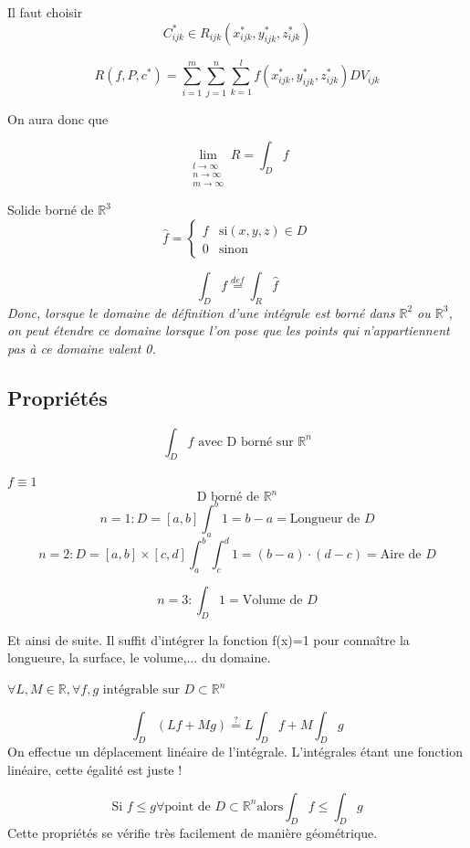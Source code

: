  Il faut choisir \[C_{ijk}^* \in R_{ijk} ( x_{ijk}^*,y_{ijk}^*,z_{ijk}^*)\]

\[R(f,P,c^*)=\sum_{i=1}^m \sum_{j=1}^n\sum_{k=1}^l f (x_{ijk}^*,y_{ijk}^*,z_{ijk}^*) D V_{ijk}\]

On aura donc que

$$\lim\limits_{\substack{l \to \infty \\ n \to \infty\\ m \to \infty}} R=\int_D f$$

Solide borné de $\mathbb{R}^3$
\[\hat{f}=
\left\{
\begin{array}{rr}
f & \text{si}(x,y,z)\in D \\
0 & \text{sinon}

\end{array}
\right.
\]

\[\int_D f \overset{def}{=} \int_R \hat{f}\]
\emph{
Donc, lorsque le domaine de définition d'une intégrale est borné dans $\mathbb{R}^2$ ou $\mathbb{R}^3$, on peut étendre ce domaine lorsque l'on pose que les points qui n'appartiennent pas à ce domaine valent 0.}
\subsection{Propriétés}

\[\int_D f \text{ avec D borné sur } \mathbb{R}^n\]

\begin{myprop}
$f\equiv 1 $
\[\text{D borné de }\mathbb{R}^n\]
\[n=1 : D=[a,b] \int_a^b 1 = b-a = \text{Longueur de }D\]
\[n=2 : D=[a,b]\times[c,d] \int_a^b \int_c^d 1 = (b-a) \cdot (d-c)= \text{Aire de }D\]

\[n=3 : \int_D 1 = \text{Volume de }D\]

Et ainsi de suite. Il suffit d'intégrer la fonction f(x)=1 pour connaître la longueure, la surface, le volume,... du domaine.
\end{myprop}


\begin{myprop}
$\forall L,M \in \mathbb{R} ,\forall f,g \text{ intégrable sur } D \subset \mathbb{R}^n$


\[\int_D(Lf+Mg)\overset{?}{=}L\int_D f + M \int_D g\]
On effectue un déplacement linéaire de l'intégrale. L'intégrales étant une fonction linéaire, cette égalité est juste !

\end{myprop}


\begin{myprop}
$$\text{Si } f \le  g  \forall \text{point de }D\subset \mathbb{R}^n \text{alors} \int_D f \le \int_D g $$
Cette propriétés se vérifie très facilement de manière géométrique.
\end{myprop}


